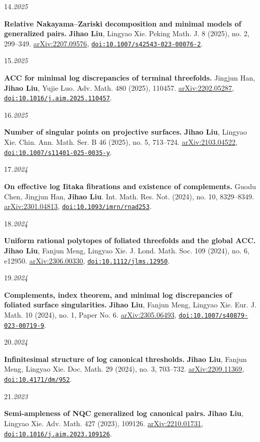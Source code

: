 \documentclass[11pt]{article}
\newlength{\datewidth}
\newcommand{\pubitem}[3]{%
  \noindent
  \begin{minipage}[t]{\datewidth}
    \raggedright\small\color{muted}#1.\;\textit{#2}
  \end{minipage}%
  \hfill%
  \begin{minipage}[t]{\dimexpr\linewidth-\datewidth-0.1in\relax}
    \raggedright #3
  \end{minipage}\par\vspace{4pt}
}
\newcommand{\paper}[1]{\textbf{#1}}
\newcommand{\me}{\textbf{Jihao Liu}}
\newcommand{\idlink}[2]{\href{#1}{\nolinkurl{#2}}}
\begin{document}
\pubitem{14}{2025}{%
  \paper{Relative Nakayama--Zariski decomposition and minimal models of generalized pairs.}
  \me, Lingyao Xie.
  Peking Math. J. 8 (2025), no. 2, 299--349.
  \href{https://arxiv.org/abs/2207.09576}{arXiv:2207.09576}, \idlink{https://doi.org/10.1007/s42543-023-00076-2}{doi:10.1007/s42543-023-00076-2}.}


\pubitem{15}{2025}{%
  \paper{ACC for minimal log discrepancies of terminal threefolds.}
  Jingjun Han, \me, Yujie Luo.
  Adv. Math. 480 (2025), 110457.
  \href{https://arxiv.org/abs/2202.05287}{arXiv:2202.05287}, \idlink{https://doi.org/10.1016/j.aim.2025.110457}{doi:10.1016/j.aim.2025.110457}.}


\pubitem{16}{2025}{%
  \paper{Number of singular points on projective surfaces.}
  \me, Lingyao Xie.
  Chin. Ann. Math. Ser. B 46 (2025), no. 5, 713--724.
  \href{https://arxiv.org/abs/2103.04522}{arXiv:2103.04522}, \idlink{https://doi.org/10.1007/s11401-025-0035-y}{doi:10.1007/s11401-025-0035-y}.}


\pubitem{17}{2024}{%
  \paper{On effective log Iitaka fibrations and existence of complements.}
  Guodu Chen, Jingjun Han, \me.
  Int. Math. Res. Not. (2024), no. 10, 8329--8349.
  \href{https://arxiv.org/abs/2301.04813}{arXiv:2301.04813}, \idlink{https://doi.org/10.1093/imrn/rnad253}{doi:10.1093/imrn/rnad253}.}


\pubitem{18}{2024}{%
  \paper{Uniform rational polytopes of foliated threefolds and the global ACC.}
  \me, Fanjun Meng, Lingyao Xie.
  J. Lond. Math. Soc. 109 (2024), no. 6, e12950.
  \href{https://arxiv.org/abs/2306.00330}{arXiv:2306.00330}, \idlink{https://doi.org/10.1112/jlms.12950}{doi:10.1112/jlms.12950}.}


\pubitem{19}{2024}{%
  \paper{Complements, index theorem, and minimal log discrepancies of foliated surface singularities.}
  \me, Fanjun Meng, Lingyao Xie.
  Eur. J. Math. 10 (2024), no. 1, Paper No. 6.
  \href{https://arxiv.org/abs/2305.06493}{arXiv:2305.06493}, \idlink{https://doi.org/10.1007/s40879-023-00719-9}{doi:10.1007/s40879-023-00719-9}.}


\pubitem{20}{2024}{%
  \paper{Infinitesimal structure of log canonical thresholds.}
  \me, Fanjun Meng, Lingyao Xie.
  Doc. Math. 29 (2024), no. 3, 703--732.
  \href{https://arxiv.org/abs/2209.11369}{arXiv:2209.11369}, \idlink{https://doi.org/10.4171/dm/952}{doi:10.4171/dm/952}.}


\pubitem{21}{2023}{%
  \paper{Semi-ampleness of NQC generalized log canonical pairs.}
  \me, Lingyao Xie.
  Adv. Math. 427 (2023), 109126.
  \href{https://arxiv.org/abs/2210.01731}{arXiv:2210.01731}, \idlink{https://doi.org/10.1016/j.aim.2023.109126}{doi:10.1016/j.aim.2023.109126}.}
\end{document}
